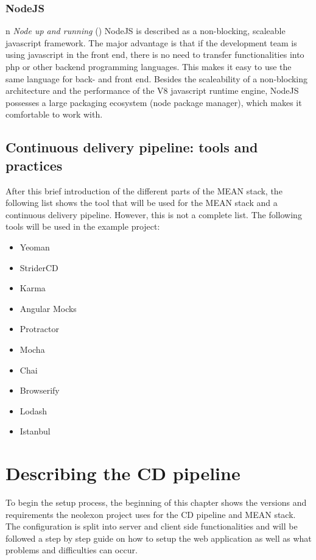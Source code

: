 \subsubsection{NodeJS}
n \textit{Node up and running} (\cite{hughes2012node}) NodeJS is described as a non-blocking, scaleable javascript framework. The major advantage is that
if the development team is using javascript in the front end, there is no need to transfer functionalities into php or other backend programming languages.
This makes it easy to use the same language for back- and front end. Besides the scaleability of a non-blocking architecture and the performance
of the V8 javascript runtime engine, NodeJS possesses a large packaging ecosystem (node package manager), which makes it comfortable to work with.

\subsection{Continuous delivery pipeline: tools and practices}
After this brief introduction of the different parts of the MEAN stack, the following list shows the tool that will be used for the MEAN stack and a
continuous delivery pipeline. However, this is not a complete list. The following tools will be used in the example project:

\begin{itemize}
  \item Yeoman
  \item StriderCD
  \item Karma
  \item Angular Mocks
  \item Protractor
  \item Mocha
  \item Chai
  \item Browserify
  \item Lodash
  \item Istanbul
\end{itemize}

\section{Describing the CD pipeline}
\label{section:Describing CD Pipeline (WIP)}
To begin the setup process, the beginning of this chapter shows the versions and requirements the neolexon project uses for the CD pipeline and MEAN stack.
The configuration is split into server and client side functionalities and will be followed a step by step guide on how to setup the web application
as well as what problems and difficulties can occur.

